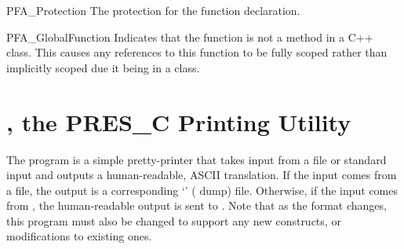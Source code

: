 \begin{cprototypelist}
\begin{cidentifierlist}
    \item[PFA_Protection]  The
    protection for the function declaration.

    \item[PFA_GlobalFunction] \tagtypenull{} Indicates that the function is not
    a method in a C++ class.  This causes any references to this function to be
    fully scoped rather than implicitly scoped due it being in a class.
  \end{cidentifierlist}
\end{cprototypelist}



\section{\presd{}, the PRES\_C Printing Utility}
\label{sec:PRESC:presd, the PRESC Printing Utility}

The \presd{} program is a simple pretty-printer that takes \PRESC{} input from
a file or standard input and outputs a human-readable, ASCII translation.  If
the \PRESC{} input comes from a file, the output is a corresponding
`' (\PRESC{} dump) file.  Otherwise, if the \PRESC{} input comes
from , the human-readable output is sent to
.  Note that as the \PRESC{} format changes, this program
must also be changed to support any new constructs, or modifications to
existing ones.



%



